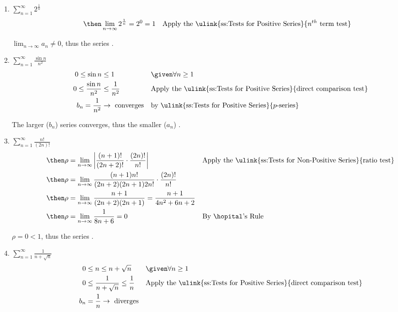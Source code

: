 \begin{enumerate}[itemsep=3em]
  \item \(\displaystyle \sum_{n=1}^{\infty} 2^\frac{1}{n} \)
    \begin{align*}
      &\then \lim_{n \to \infty} 2^{\frac{1}{n}} = 2^0 = 1
      && \text{Apply the \ulink{ss:Tests for Positive Series}{\(n^{th} \) term test}}
    \end{align*}

    \(\lim_{n \to \infty} a_n \neq 0\), thus the series .

  \item \(\displaystyle \sum_{n=1}^{\infty} \frac{\sin n}{n^2} \)
    \begin{align*}
      0 \leq \sin  n &\leq 1 && \given \forall n \geq 1 \\
      0 \leq \frac{\sin n}{n^2} &\leq \frac{1}{n^2}
      && \text{Apply the \ulink{ss:Tests for Positive Series}{direct comparison test}} \\
      b_n = \frac{1}{n^2} &\to ~\text{converges}
      && \text{by \ulink{ss:Tests for Positive Series}{\(p\)-series}}
    \end{align*}

    The larger (\(b_n\)) series converges, thus the smaller (\(a_n\)) .

  \item \(\displaystyle \sum_{n=1}^{\infty} \frac{n!}{(2n)!} \)
    \begin{align*}
     &\then \rho = \lim_{n \to \infty} \left|
     \frac{(n+1)!}{(2n+2)!} \cdot \frac{(2n)!}{n!} \right|
     && \text{Apply the \ulink{ss:Tests for Non-Positive Series}{ratio test}} \\
     &\then \rho = \lim_{n \to \infty}
     \frac{(n+1)n!}{(2n+2)(2n+1)2n!} \cdot \frac{(2n)!}{n!} \\
     &\then \rho = \lim_{n \to \infty}
     \frac{n+1}{(2n+2)(2n+1)} =
     \frac{n+1}{4n^2+6n+2} \\
     &\then \rho = \lim_{n \to \infty} \frac{1}{8n + 6} = 0
     && \text{By \hopital's Rule} \\
    \end{align*}

  \(\rho = 0 < 1\), thus the series .

  \item \(\displaystyle \sum_{n=1}^{\infty} \frac{1}{n + \sqrt{n} } \)
    \begin{align*}
      0 &\leq n \leq n +\sqrt{n}  && \given \forall n \geq 1 \\
      0 &\leq \frac{1}{n+\sqrt{n} } \leq \frac{1}{n}
      && \text{Apply the \ulink{ss:Tests for Positive Series}{direct comparison test}} \\
      b_n &= \frac{1}{n} \to ~\text{diverges}
    \end{align*}


\end{enumerate}
